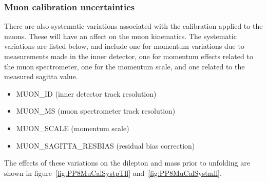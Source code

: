\subsubsection{Muon calibration uncertainties}
There are also systematic variations associated with the calibration applied to the muons. These will have an affect on the muon kinematics. The systematic variations are listed below, and include
one for momentum variations due to measurements made in the inner detector, one for momentum effects related to the muon spectrometer, one for the momentum scale, and one related to the measured sagitta value.
\begin{itemize}
  \setlength{\itemsep}{1pt}\setlength{\parskip}{0pt}\setlength{\parsep}{0pt}
  \item MUON\_ID (inner detector track resolution)
  \item MUON\_MS (muon spectrometer track resolution)
  \item MUON\_SCALE (momentum scale)
  \item MUON\_SAGITTA\_RESBIAS (residual bias correction)
\end{itemize}

The effects of these variations on the dilepton \pt and mass prior to unfolding are shown in figure~\ref{fig:PP8MuCalSystpTll} and~\ref{fig:PP8MuCalSystmll}.

